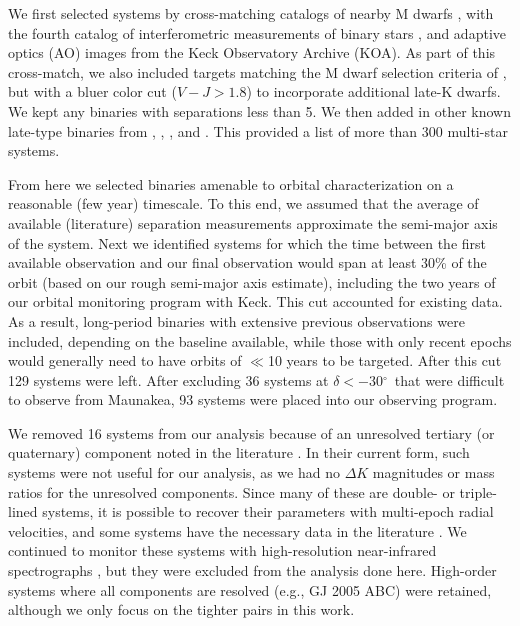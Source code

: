 \documentclass[twocolumn]{aastex62}
\newcommand{\degree}{$^{\circ}$}
\begin{document}
We first selected systems by cross-matching catalogs of nearby M dwarfs \citep{Lepine:2013, Gaidos2014, 2014ApJ...784..156D,Winters2015}, with the fourth catalog of interferometric measurements of binary stars \citep[INT4,][]{Hartkopf:2001}, and adaptive optics (AO) images from the Keck Observatory Archive (KOA). As part of this cross-match, we also included targets matching the M dwarf selection criteria of \citet{Gaidos2014}, but with a bluer color cut ($V-J>1.8$) to incorporate additional late-K dwarfs. We kept any binaries with separations less than 5\arcsec. We then added in other known late-type binaries from \citet{2008MNRAS.384..150L}, \citet{Jnn2012}, \citet{Jnn2014}, and \citet{Ward-Duong2015}. This provided a list of more than 300 multi-star systems.

From here we selected binaries amenable to orbital characterization on a reasonable (few year) timescale. To this end, we assumed that the average of available (literature) separation measurements approximate the semi-major axis of the system. Next we identified systems for which the time between the first available observation and our final observation would span at least 30\% of the orbit (based on our rough semi-major axis estimate), including the two years of our orbital monitoring program with Keck. This cut accounted for existing data. As a result, long-period binaries with extensive previous observations were included, depending on the baseline available, while those with only recent epochs would generally need to have orbits of $\ll$10 years to be targeted. After this cut 129 systems were left. After excluding 36 systems at $\delta<-30$\degree\ that were difficult to observe from Maunakea, 93 systems were placed into our observing program. 

We removed 16 systems from our analysis because of an unresolved tertiary (or quaternary) component noted in the literature \citep[e.g.,][]{2010ApJ...720.1727L,2002A&A...382..118T,2018ApJS..235....6T}. In their current form, such systems were not useful for our analysis, as we had no $\Delta K$ magnitudes or mass ratios for the unresolved components. Since many of these are double- or triple-lined systems, it is possible to recover their parameters with multi-epoch radial velocities, and some systems have the necessary data in the literature \citep[e.g.,][]{Sgr2000}. We continued to monitor these systems with high-resolution near-infrared spectrographs \citep{2010SPIE.7735E..1MY, 2012SPIE.8446E..2CR, Park2014}, but they were excluded from the analysis done here. High-order systems where all components are resolved (e.g., GJ 2005 ABC) were retained, although we only focus on the tighter pairs in this work. 
\end{document}
